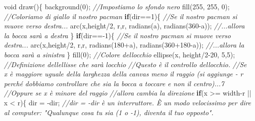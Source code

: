 \documentclass[
]{article}
\newenvironment{Shaded}{}{}
\newcommand{\CommentTok}[1]{\textcolor[rgb]{0.38,0.63,0.69}{\textit{#1}}}
\newcommand{\ControlFlowTok}[1]{\textcolor[rgb]{0.00,0.44,0.13}{\textbf{#1}}}
\newcommand{\DataTypeTok}[1]{\textcolor[rgb]{0.56,0.13,0.00}{#1}}
\newcommand{\DecValTok}[1]{\textcolor[rgb]{0.25,0.63,0.44}{#1}}
\newcommand{\FunctionTok}[1]{\textcolor[rgb]{0.02,0.16,0.49}{#1}}
\newcommand{\NormalTok}[1]{#1}
\newcommand{\OperatorTok}[1]{\textcolor[rgb]{0.40,0.40,0.40}{#1}}
\begin{document}
\begin{Shaded}
\begin{Highlighting}[]
\DataTypeTok{void} \FunctionTok{draw}\OperatorTok{()\{}
    \FunctionTok{background}\OperatorTok{(}\DecValTok{0}\OperatorTok{);} \CommentTok{//Impostiamo lo sfondo nero}
    \FunctionTok{fill}\OperatorTok{(}\DecValTok{255}\OperatorTok{,} \DecValTok{255}\OperatorTok{,} \DecValTok{0}\OperatorTok{);} \CommentTok{//Coloriamo di giallo il nostro pacman}
    \ControlFlowTok{if}\OperatorTok{(}\NormalTok{dir}\OperatorTok{==}\DecValTok{1}\OperatorTok{)\{} \CommentTok{//Se il nostro pacman si muove verso destra...}
    \FunctionTok{arc}\OperatorTok{(}\NormalTok{x}\OperatorTok{,}\NormalTok{height}\OperatorTok{/}\DecValTok{2}\OperatorTok{,}\NormalTok{ r}\OperatorTok{,}\NormalTok{r}\OperatorTok{,} \FunctionTok{radians}\OperatorTok{(}\NormalTok{a}\OperatorTok{),} \FunctionTok{radians}\OperatorTok{(}\DecValTok{360}\OperatorTok{{-}}\NormalTok{a}\OperatorTok{));} \CommentTok{//...allora la bocca sarà a destra}
    \OperatorTok{\}}
    \ControlFlowTok{if}\OperatorTok{(}\NormalTok{dir}\OperatorTok{=={-}}\DecValTok{1}\OperatorTok{)\{} \CommentTok{//Se il nostro pacman si muove verso destra...}
        \FunctionTok{arc}\OperatorTok{(}\NormalTok{x}\OperatorTok{,}\NormalTok{height}\OperatorTok{/}\DecValTok{2}\OperatorTok{,}\NormalTok{ r}\OperatorTok{,}\NormalTok{r}\OperatorTok{,} \FunctionTok{radians}\OperatorTok{(}\DecValTok{180}\OperatorTok{+}\NormalTok{a}\OperatorTok{),} \FunctionTok{radians}\OperatorTok{(}\DecValTok{360}\OperatorTok{+}\DecValTok{180}\OperatorTok{{-}}\NormalTok{a}\OperatorTok{));} \CommentTok{//...allora la bocca sarà a sinistra}
    \OperatorTok{\}}
    \FunctionTok{fill}\OperatorTok{(}\DecValTok{0}\OperatorTok{);} \CommentTok{//Colore dell\textquotesingle{}occhio}
    \FunctionTok{ellipse}\OperatorTok{(}\NormalTok{x}\OperatorTok{,}\NormalTok{ height}\OperatorTok{/}\DecValTok{2}\OperatorTok{{-}}\DecValTok{20}\OperatorTok{,} \DecValTok{5}\OperatorTok{,}\DecValTok{5}\OperatorTok{);} \CommentTok{//Definizione dell\textquotesingle{}ellisse che sarà l\textquotesingle{}occhio}
    \CommentTok{//Questo è il controllo dell\textquotesingle{}occhio. }
    \CommentTok{//Se x è maggiore uguale della larghezza della canvas meno il raggio (si aggiunge {-} r perché dobbiamo controllare che sia la bocca a toccare e non il centro)...7}
    \CommentTok{//Oppure se x è minore del raggio}
    \CommentTok{//allora cambia la direzione}
    \ControlFlowTok{if}\OperatorTok{(}\NormalTok{x }\OperatorTok{\textgreater{}=}\NormalTok{ width}\OperatorTok{{-}}\NormalTok{r }\OperatorTok{||}\NormalTok{ x }\OperatorTok{\textless{}}\NormalTok{ r}\OperatorTok{)\{} 
\NormalTok{            dir }\OperatorTok{=} \OperatorTok{{-}}\NormalTok{dir}\OperatorTok{;} \CommentTok{//dir = {-}dir è un interruttore. È un modo velocissimo per dire al computer: "Qualunque cosa tu sia (1 o {-}1), diventa il tuo opposto".}

\end{Highlighting}
\end{Shaded}
\end{document}
